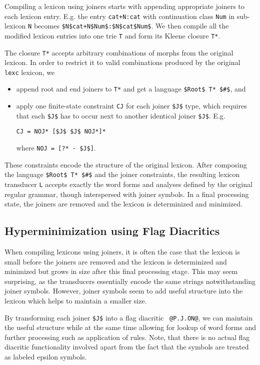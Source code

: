 \documentclass[11pt]{article}
\begin{document}
Compiling a lexicon using joiners starts with appending appropriate joiners to each lexicon entry. E.g. the entry {\tt cat+N:cat} with continuation class {\tt Num} in sub-lexicon {\tt N} becomes {\tt \$N\$cat+N\$Num\$:\$N\$cat\$Num\$}. We then compile all the modified lexicon entries into one trie {\tt T} and form its Kleene closure {\tt T*}. 

The closure {\tt T*} accepts arbitrary combinations of morphs from the original lexicon. In order to restrict it to valid combinations produced by the original {\tt lexc} lexicon, we 

\begin{itemize}
\item append root and end joiners to {\tt T*} and get a language {\tt \$Root\$ T* \$\#\$}, and
\item apply one finite-state constraint {\tt CJ} for each joiner {\tt \$J\$} type, which requires that each {\tt \$J\$} has to occur next to another identical joiner {\tt \$J\$}. E.g.
\begin{verbatim}
CJ = NOJ* [$J$ $J$ NOJ*]*
\end{verbatim}
where {\tt NOJ = [?* - \$J\$]}.

\end{itemize}

These constraints encode the structure of the original lexicon. After
composing the language {\tt \$Root\$ T* \$\#\$} and the joiner
constraints, the resulting lexicon transducer {\tt L} accepts exactly
the word forms and analyses defined by the original regular grammar,
though interspersed with joiner symbols. In a final processing state,
the joiners are removed and the lexicon is determinized and minimized.

\subsection{Hyperminimization using Flag Diacritics}

When compiling lexicons using joiners, it is often the case that the
lexicon is small before the joiners are removed and the lexicon is
determinized and minimized but grows in size after this final
processing stage. This may seem surprising, as the transducers
essentially encode the same strings notwithstanding joiner
symbols. However, joiner symbols seem to add useful structure into
the lexicon which helps to maintain a smaller size.

By transforming each joiner {\tt \$J\$} into a flag diacritic {\tt
  @P.J.ON@}, we can maintain the useful structure while at the same
time allowing for lookup of word forms and further processing such as application of
rules. Note, that there is no actual flag diacritic functionality involved
apart from the fact that the symbols are treated as labeled epsilon
symbols.
\end{document}
